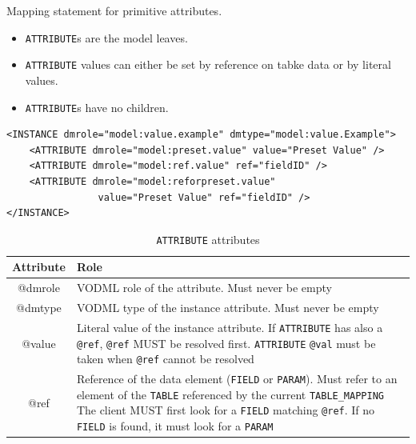 \documentclass[11pt,a4paper]{ivoa}
\begin{document}
Mapping statement for primitive attributes.

\begin{itemize}
    \item \texttt{ATTRIBUTE}s  are the model leaves.     
    \item \texttt{ATTRIBUTE}  values can either be set by reference on tabke data or by literal values. 
    \item \texttt{ATTRIBUTE}s have no children.
\end{itemize}

\begin{lstlisting}[caption={ATTRIBUTE examples},style=XML]
<INSTANCE dmrole="model:value.example" dmtype="model:value.Example">
    <ATTRIBUTE dmrole="model:preset.value" value="Preset Value" />    
    <ATTRIBUTE dmrole="model:ref.value" ref="fieldID" />    
    <ATTRIBUTE dmrole="model:reforpreset.value" 
                value="Preset Value" ref="fieldID" />
</INSTANCE>
\end{lstlisting}


\begin{table}[!h]
\small
\centering
\begin{tabulary}{\linewidth}{|c|J|}
       \hline 
          \textbf{Attribute} & 
          \textbf{Role}\\
       \hline         \hline  
          @dmrole    & 
           VODML role of the attribute. 
           \newline  Must never be empty\\       
       \hline 
          @dmtype    & 
          VODML type of the instance attribute.
           \newline  Must never be empty\\
       \hline  
          @value   &
          Literal value of the instance attribute. 
                     \newline If  \texttt{ATTRIBUTE} has also a \texttt{@ref}, \texttt{@ref} MUST be resolved first.
                     \texttt{ATTRIBUTE}  \texttt{@val} must be taken when \texttt{@ref} cannot be resolved \\
        \hline
           @ref & 
            Reference of the data element (\texttt{FIELD} or \texttt{PARAM}).  
                    \newline Must refer to an element of the \texttt{TABLE}  referenced by the current     
                    \texttt{TABLE\_MAPPING}                    
                    \newline The client MUST first look for a \texttt{FIELD} matching \texttt{@ref}. 
                    \newline If no \texttt{FIELD}  is found, it must look for a \texttt{PARAM}
                    \\
       \hline 
     \end{tabulary}
     \caption{\texttt{ATTRIBUTE} attributes} 
     \label{tbl:att-att}
 \end{table}
\end{document}
